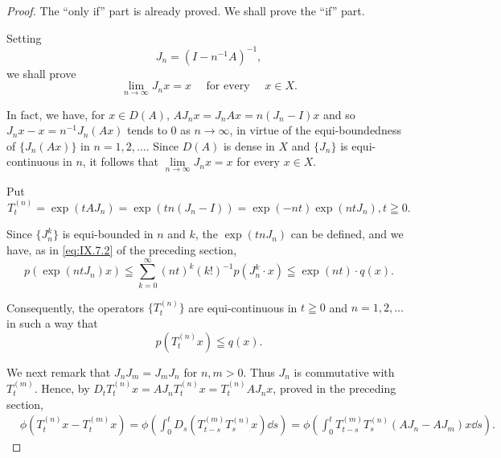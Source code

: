 \begin{proof}
 The ``only if'' part is already proved. We shall prove the ``if'' part. 

Setting 
\begin{equation}\label{eq:IX.7.1}
J _{n} = (I - n ^{-1} A) ^{-1},
\end{equation}
we shall prove 
\begin{equation}\label{eq:IX.7.2}
\lim\limits _{n \rightarrow \infty} J _{n} x = x \quad \text{ for every } \quad x \in X.
\end{equation}

In fact, we have, for $x \in D(A)$, $A J_n x = J_n A x = n(J_n - I)x$ and so $J_n x - x = n^{-1} J_n(Ax)$ tends to $0$ as $n \to \infty$, in virtue of the equi-boundedness of $\{J_n(Ax)\}$ in $n = 1, 2, \ldots$. Since $D(A)$ is dense in $X$ and $\{J_n\}$ is equi-continuous in $n$, it follows that $\lim\limits_{n \to \infty} J_n x = x$ for every $x \in X$. 


Put 
\begin{equation}\label{eq:IX.7.3}
T _{t} ^{(n)} = \exp (t A J _{n}) = \exp (t n (J _{n} - I)) = \exp (- n t) \exp (n t J _{n}), t \geqq 0.
\end{equation}

Since $\{J_n^k\}$ is equi-bounded in $n$ and $k$, the $\exp(t n J_n)$ can be defined, and we have, as in \eqref{eq:IX.7.2} of the preceding section, 
\[
p \left(\exp (n t J _{n}) x\right) \leqq \sum\limits_{k=0} ^{\infty} (n t) ^{k} (k!) ^{-1} p \left(J _{n} ^{k} \cdot x\right) \leqq \exp (n t) \cdot q (x).
\]

Consequently, the operators $\{T_t^{(n)}\}$ are equi-continuous in $t \geqq 0$ and $n = 1, 2, \ldots$ in such a way that 
\begin{equation}\label{eq:IX.7.4}
p \left(T _{t} ^{(n)} x\right) \leqq q (x).
\end{equation}

We next remark that $J_{n}J_{m}=J_{m}J_{n}$ for $n, m>0$. Thus $J_{n}$ is commutative with $T_{t}^{(m)}$. Hence, by $D_{t}T_{t}^{(n)}x=AJ_{n}T_{t}^{(n)}x=T_{t}^{(n)}AJ_{n}x$, proved in the preceding section, 
\begin{equation}\label{eq:IX.7.5}
\begin{aligned}
&\phi (T _{t} ^{(n)} x - T _{t} ^{(m)} x)  = \phi \left(\int_{0} ^{t} D _{s} (T _{t-s} ^{(m)} T _{s} ^{(n)} x) \dd s\right) = \phi \left(\int_{0} ^{t} T _{t-s} ^{(m)} T _{s} ^{(n)} (A J _{n} - A J _{m}) x \dd s\right).
\end{aligned}
\end{equation}


\end{proof}
